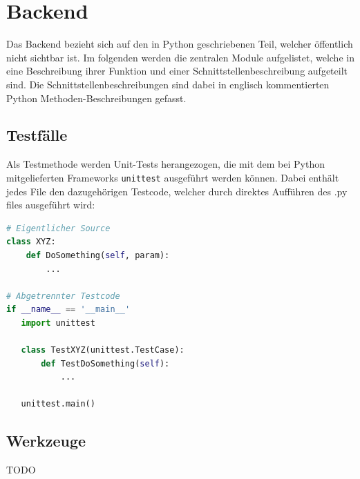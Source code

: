 \chapter{Backend}
\label{cha:backend}
Das Backend bezieht sich auf den in Python geschriebenen Teil, welcher öffentlich nicht sichtbar ist.
Im folgenden werden die zentralen Module aufgelistet, welche in eine Beschreibung ihrer Funktion und einer 
Schnittstellenbeschreibung aufgeteilt sind. Die Schnittstellenbeschreibungen sind dabei in englisch kommentierten
Python Methoden-Beschreibungen gefasst. 

\section{Testfälle}
Als Testmethode werden Unit-Tests herangezogen, die mit dem bei Python mitgelieferten Frameworks \texttt{unittest}
ausgeführt werden können. Dabei enthält jedes File den dazugehörigen Testcode, welcher durch direktes Aufführen des
.py files ausgeführt wird:

\begin{lstlisting}[language=Python]
# Eigentlicher Source
class XYZ:
    def DoSomething(self, param):
        ...

# Abgetrennter Testcode
if __name__ == '__main__'
   import unittest

   class TestXYZ(unittest.TestCase):
       def TestDoSomething(self):
           ...

   unittest.main()
\end{lstlisting}

\section{Werkzeuge}
TODO

\newpage
